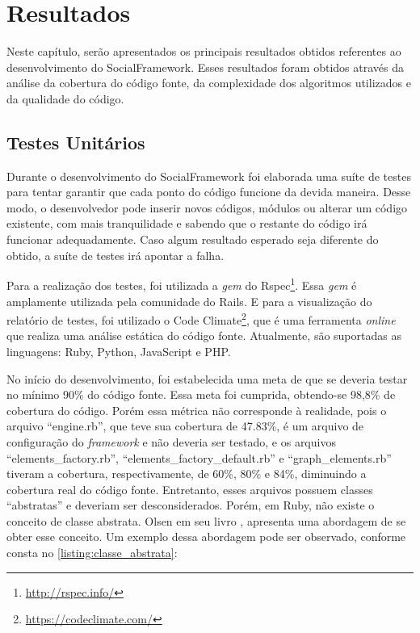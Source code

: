 \chapter{Resultados}
\label{chapter:Resultados}

Neste capítulo, serão apresentados os principais resultados obtidos referentes ao desenvolvimento do SocialFramework. Esses resultados foram obtidos através da análise da cobertura do código fonte, da complexidade dos algoritmos utilizados e da qualidade do código.

\section{Testes Unitários}

Durante o desenvolvimento do SocialFramework foi elaborada uma suíte de testes para tentar garantir que cada ponto do código funcione da devida maneira. Desse modo, o desenvolvedor pode inserir novos códigos, módulos ou alterar um código existente, com mais tranquilidade e sabendo que o restante do código irá funcionar adequadamente. Caso algum resultado esperado seja diferente do obtido, a suíte de testes irá apontar a falha.

Para a realização dos testes, foi utilizada a \textit{gem} do Rspec\footnote{\url{http://rspec.info/}}. Essa \textit{gem} é amplamente utilizada pela comunidade do Rails. E para a visualização do relatório de testes, foi utilizado o Code Climate\footnote{\url{https://codeclimate.com/}}, que é uma ferramenta \textit{online} que realiza uma análise estática do código fonte. Atualmente, são suportadas as linguagens: Ruby, Python, JavaScript e PHP.

No início do desenvolvimento, foi estabelecida uma meta de que se deveria testar no mínimo 90\% do código fonte. Essa meta foi cumprida, obtendo-se 98,8\% de cobertura do código. Porém essa métrica não corresponde à realidade, pois o arquivo ``engine.rb'', que teve sua cobertura de 47.83\%, é um arquivo de configuração do \textit{framework} e não deveria ser testado, e os arquivos  ``elements\_factory.rb'', ``elements\_factory\_default.rb'' e ``graph\_elements.rb'' tiveram a cobertura, respectivamente, de 60\%, 80\% e 84\%, diminuindo a cobertura real do código fonte. Entretanto, esses arquivos possuem classes ``abstratas'' e deveriam ser desconsiderados. Porém, em Ruby, não existe o conceito de classe abstrata. Olsen em seu livro \cite{Olsen:2007}, apresenta uma abordagem de se obter esse conceito. Um exemplo dessa abordagem pode ser observado, conforme consta no \ref{listing:classe_abstrata}:

